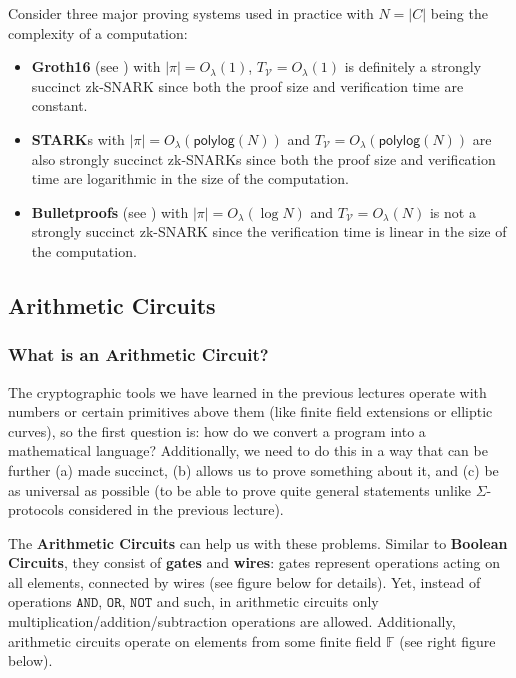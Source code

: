 \documentclass[../../book.tex]{subfiles}
\begin{document}
\begin{example}
    Consider three major proving systems used in practice with $N=|C|$ being the complexity of a computation:
    \begin{itemize}
        \item \textbf{Groth16} (see ) with $|\pi| =
        O_{\lambda}(1)$, $T_{\mathcal{V}} = O_{\lambda}(1)$ is definitely a
        strongly succinct zk-SNARK since both the proof size and verification
        time are constant.
        \item \textbf{STARK}s with $|\pi| = O_{\lambda}(\mathsf{polylog}(N))$
        and $T_{\mathcal{V}} = O_{\lambda}(\mathsf{polylog}(N))$ are also
        strongly succinct zk-SNARKs since both the proof size and verification
        time are logarithmic in the size of the computation.
        \item \textbf{Bulletproofs} (see ) with
        $|\pi| = O_{\lambda}(\log N)$ and $T_{\mathcal{V}} = O_{\lambda}(N)$ is
        not a strongly succinct zk-SNARK since the verification time is linear
        in the size of the computation.
    \end{itemize}
\end{example}

\subsection{Arithmetic Circuits}

\subsubsection{What is an Arithmetic Circuit?}
The cryptographic tools we have learned in the previous lectures operate with
numbers or certain primitives above them (like finite field extensions or
elliptic curves), so the first question is: how do we convert a program into a
mathematical language? Additionally, we need to do this in a way that can be
further (a) made succinct, (b) allows us to prove something about it, and (c) be
as universal as possible (to be able to prove quite general statements unlike
$\Sigma$-protocols considered in the previous lecture).

The \textbf{Arithmetic Circuits} can help us with these problems. Similar to
\textbf{Boolean Circuits}, they consist of \textbf{gates} and \textbf{wires}:
gates represent operations acting on all elements, connected by wires (see figure
below for details). Yet, instead of operations $\mathtt{AND}$, $\mathtt{OR}$,
$\mathtt{NOT}$ and such, in arithmetic circuits only
multiplication/addition/subtraction operations are allowed. Additionally,
arithmetic circuits operate on elements from some finite field $\mathbb{F}$
(see right figure below).
\end{document}
